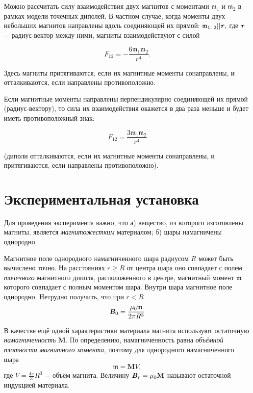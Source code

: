 \documentclass[a4paper,12pt]{article} %
\begin{document}
\hfill \break Можно рассчитать силу взаимодействия двух магнитов с моментами $\mathfrak{m}_1$ и $\mathfrak{m}_2$ в рамках модели точечных диполей. В частном случае, когда моменты двух небольших магнитов направлены вдоль соединяющей их прямой: $\mathfrak{m}_\text{1, 2} || \textbf{\textit{r}},$ где $\textbf{\textit{r}}$ $-$ радиус-вектор между ними, магниты взаимодействуют с силой

$$
F_{12} = -\frac{6\mathfrak{m}_{1}\mathfrak{m}_{2}}{r^4}.
$$

\hfill \break Здесь магниты притягиваются, если их магнитные моменты сонаправлены, и отталкиваются, если направлены противоположно.

\hfill \break Если магнитные моменты направлены перпендикулярно соединяющей их прямой (радиус-вектору), то сила их взаимодействия окажется в два раза меньше и будет иметь противоположный знак:

$$
F_{12} = \frac{3\mathfrak{m}_{1}\mathfrak{m}_{2}}{r^4}
$$

\hfill \break (диполи отталкиваются, если их магнитные моменты сонаправлены, и притягиваются, если направлены противоположно).

\section{Экспериментальная установка}

 \hfill \break Для проведения эксперимента важно, что а) вещество, из которого изготовлены магниты, является \textit {магнитожестким} материалом; б) шары намагничены однородно. 

\hfill \break Магнитное поле однородного намагниченного шара радиусом $R$ может быть вычислено точно. На расстояниях $r \geq R$ от центра шара оно совпадает с полем \textit{точечного} магнитного диполя, расположенного в центре, магнитный момент $\mathfrak{m}$ которого совпадает с полным моментом шара. Внутри шара магнитное поле однородно. Hетрудно получить, что при $r < R$ \[\textbf{\textit{B}}_{0} = \frac{\mu_0 \mathfrak{m}}{2\pi R^3}\]

\hfill \break В качестве ещё одной характеристики материала магнита используют остаточную \textit {намагниченность} $\textbf{M}$. По определению, намагниченность равна \textit {объёмной плотности магнитного момента}, поэтому для однородного намагниченного шара $$\mathfrak{m}= \textbf{M}V ,$$ где $\displaystyle V = \frac{4\pi}{3}R^3$ $-$ объём магнита. Величину $\textbf{\textit{B}}_r = \mu_0 \textbf{M}$ называют остаточной индукцией материала.
\end{document}
